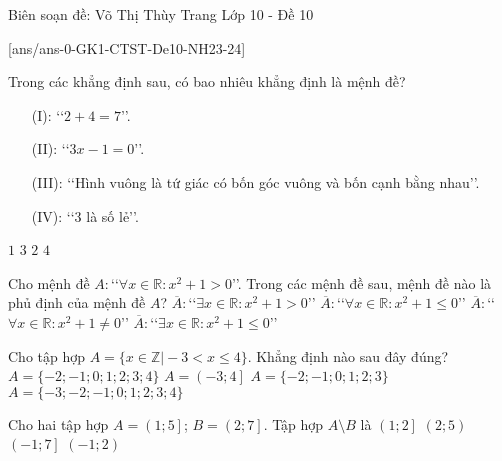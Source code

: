 \begin{name}
	{Biên soạn đề: Võ Thị Thùy Trang}
	{Lớp 10 - Đề 10} 
\end{name}
[ans/ans-0-GK1-CTST-De10-NH23-24]
\begin{ex}%
	Trong các khẳng định sau, có bao nhiêu khẳng định là mệnh đề?
	\begin{enumerate}
		\item[(I):] \lq\lq $2+4=7$\rq\rq.
		\item[(II):] \lq\lq$3x-1=0$\rq\rq.
		\item[(III):] \lq\lq Hình vuông là tứ giác có bốn góc vuông và bốn cạnh bằng nhau\rq\rq.
		\item[(IV):] \lq\lq$3$ là số lẻ\rq\rq.
	\end{enumerate}
	\choice
	{$1$}
	{\True $3$}
	{$2$}
	{$4$}
\end{ex}
\begin{ex}%
	Cho mệnh đề $A\colon$\lq\lq$\forall x \in \mathbb{R}\colon x^2+1>0$\rq\rq. Trong các mệnh đề sau, mệnh đề nào là phủ định của mệnh đề $A$?
	\choice
	{$\overline{A}\colon$\lq\lq$\exists x\in \mathbb{R}\colon x^2+1>0$\rq\rq}
	{$\overline{A}\colon$\lq\lq$\forall x\in \mathbb{R}\colon x^2+1 \leq 0$\rq\rq}
	{$\overline{A}\colon$\lq\lq$\forall x\in \mathbb{R}\colon x^2+1 \neq 0$\rq\rq}
	{\True $\overline{A}\colon $\lq\lq$\exists x\in \mathbb{R}\colon x^2+1 \leq 0$\rq\rq}
\end{ex}
\begin{ex}%
	Cho tập hợp $A=\{x\in \mathbb{Z} \Big| -3<x \leq 4\}$. Khẳng định nào sau đây đúng?
	\choice
	{\True $A=\{-2;-1;0;1;2;3;4\}$}
	{$A=\left(-3;4\right]$}
	{$A=\{-2;-1;0;1;2;3\}$}
	{$A=\{-3;-2;-1;0;1;2;3;4\}$}
\end{ex}
\begin{ex}%
	Cho hai tập hợp $A=\left(1;5\right]$; $B=\left(2;7\right]$. Tập hợp $A \setminus B$ là
	\choice
	{\True $\left(1;2\right]$}
	{$\left(2;5\right)$}
	{$\left(-1;7\right]$}
	{$\left(-1;2\right)$}
	\loigiai{
		Ta có $A \setminus B=\left(1;2\right]$. 	
	}
\end{ex}
